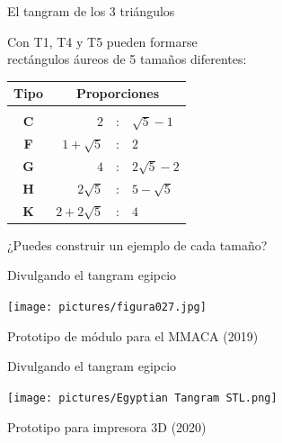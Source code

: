 \documentclass[14pt,aspectratio=169,usenames,dvipsnames]{beamer}
\begin{document}
    \begin{frame}{El tangram de los 3 triángulos}
        \begin{center}
            Con T1, T4 y T5 pueden formarse\\[0.5ex]rectángulos áureos de 5 tamaños diferentes:

            \bigskip\bigskip

            {\small\begin{tabular}{c|rcl}
                \textbf{Tipo} & \multicolumn{3}{c}{\textbf{Proporciones}} \\[0.5ex]\hline&&&\\[-1.5ex]
                \textbf{C} & $2$               &\!\!\!\!:\!\!\!\!& $\sqrt{5}\!-\!1$  \\
                \textbf{F} & $1\!+\!\sqrt{5}$  &\!\!\!\!:\!\!\!\!& $2$               \\
                \textbf{G} & $4$               &\!\!\!\!:\!\!\!\!& $2\sqrt{5}\!-\!2$ \\
                \textbf{H} & $2\sqrt{5}$       &\!\!\!\!:\!\!\!\!& $5\!-\!\sqrt{5}$  \\
                \textbf{K} & $2\!+\!2\sqrt{5}$ &\!\!\!\!:\!\!\!\!& $4$               \\
            \end{tabular}}

            \bigskip\bigskip

            ¿Puedes construir un ejemplo de cada tamaño?
        \end{center}
    \end{frame}


    \begin{frame}{Divulgando el tangram egipcio}
        \begin{center}
            \texttt{[image: pictures/figura027.jpg]} \\

            \bigskip

            Prototipo de módulo para el MMACA (2019)
        \end{center}
    \end{frame}


    \begin{frame}{Divulgando el tangram egipcio}
        \begin{center}
            {\texttt{[image: pictures/Egyptian Tangram STL.png]}} \\\medskip

            Prototipo para impresora 3D (2020)
        \end{center}
    \end{frame}
\end{document}
